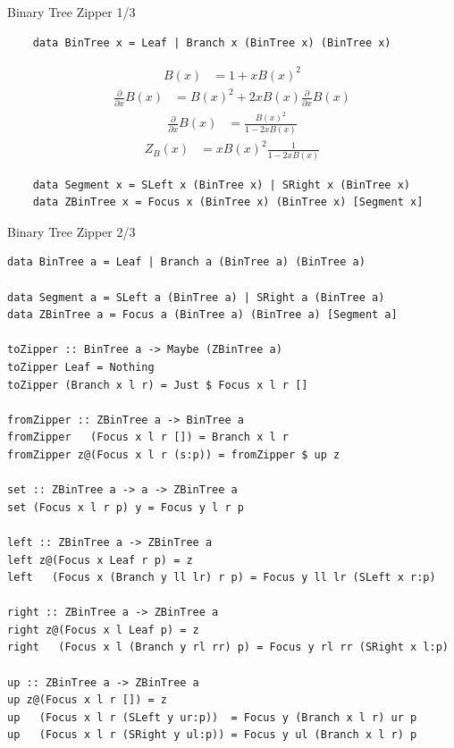 \documentclass[pdf]{beamer}
\begin{document}
\begin{frame}[fragile]{Binary Tree Zipper 1/3}
  \begin{verbatim}
    data BinTree x = Leaf | Branch x (BinTree x) (BinTree x)
  \end{verbatim}
  \begin{align*}
    B(x) &= 1 + x B(x)^2
  \end{align*}
  \begin{align*}
    \frac{\partial}{\partial{x}}B(x) &= B(x)^2 + 2 x B(x) \frac{\partial}{\partial{x}}B(x)
  \end{align*}
  \begin{align*}
    \frac{\partial}{\partial{x}}B(x) &= \frac{B(x)^2}{1 - 2 x B(x)}
  \end{align*}
  \begin{align*}
    Z_B(x) &= x B(x)^2 \frac{1}{1 - 2 x B(x)}
  \end{align*}
  \begin{verbatim}
    data Segment x = SLeft x (BinTree x) | SRight x (BinTree x)
    data ZBinTree x = Focus x (BinTree x) (BinTree x) [Segment x]
  \end{verbatim}
\end{frame}

\begin{frame}[fragile]{Binary Tree Zipper 2/3}
  \begin{verbatim}
data BinTree a = Leaf | Branch a (BinTree a) (BinTree a)

data Segment a = SLeft a (BinTree a) | SRight a (BinTree a)
data ZBinTree a = Focus a (BinTree a) (BinTree a) [Segment a]

toZipper :: BinTree a -> Maybe (ZBinTree a)
toZipper Leaf = Nothing
toZipper (Branch x l r) = Just $ Focus x l r []

fromZipper :: ZBinTree a -> BinTree a
fromZipper   (Focus x l r []) = Branch x l r
fromZipper z@(Focus x l r (s:p)) = fromZipper $ up z

set :: ZBinTree a -> a -> ZBinTree a
set (Focus x l r p) y = Focus y l r p

left :: ZBinTree a -> ZBinTree a
left z@(Focus x Leaf r p) = z
left   (Focus x (Branch y ll lr) r p) = Focus y ll lr (SLeft x r:p)

right :: ZBinTree a -> ZBinTree a
right z@(Focus x l Leaf p) = z
right   (Focus x l (Branch y rl rr) p) = Focus y rl rr (SRight x l:p)

up :: ZBinTree a -> ZBinTree a
up z@(Focus x l r []) = z
up   (Focus x l r (SLeft y ur:p))  = Focus y (Branch x l r) ur p
up   (Focus x l r (SRight y ul:p)) = Focus y ul (Branch x l r) p
  \end{verbatim}
\end{frame}
\end{document}
